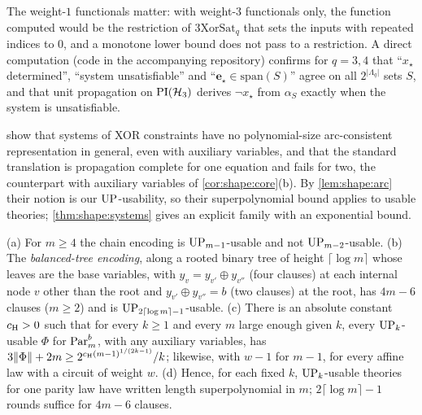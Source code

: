 The weight-$1$ functionals matter: with weight-$3$ functionals only, the function computed would be the restriction of $3\mathrm{XorSat}_q$ that sets the inputs with repeated indices to $0$, and a monotone lower bound does not pass to a restriction. A direct computation (code in the accompanying repository) confirms for $q=3,4$ that ``$x_\star$ determined'', ``system unsatisfiable'' and ``$\mathbf e_\star\in\mathrm{span}(S)$'' agree on all $2^{\lvert\Lambda_q\rvert}$ sets $S$, and that unit propagation on $\mathrm{PI}(\mathcal H_3)$ derives $\neg x_\star$ from $\alpha_S$ exactly when the system is unsatisfiable.

\begin{remark}\label{rem:shape:GK}
\citet{gwynne2014sat} show that systems of XOR constraints have no polynomial-size arc-consistent representation in general, even with auxiliary variables, and that the standard translation is propagation complete for one equation and fails for two, the counterpart with auxiliary variables of \cref{cor:shape:core}(b). By \cref{lem:shape:arc} their notion is our $\mathrm{UP}$-usability, so their superpolynomial bound applies to usable theories; \cref{thm:shape:systems} gives an explicit family with an exponential bound.
\end{remark}

\begin{proposition}\label{prop:shape:depth}
(a) For $m\ge4$ the chain encoding is $\mathrm{UP}_{m-1}$-usable and not $\mathrm{UP}_{m-2}$-usable.
(b) The \emph{balanced-tree encoding}, along a rooted binary tree of height $\lceil\log m\rceil$ whose leaves are the base variables, with $y_v=y_{v'}\oplus y_{v''}$ (four clauses) at each internal node $v$ other than the root and $y_{v'}\oplus y_{v''}=b$ (two clauses) at the root, has $4m-6$ clauses ($m\ge2$) and is $\mathrm{UP}_{2\lceil\log m\rceil-1}$-usable.
(c) There is an absolute constant $c_{\rm H}>0$ such that for every $k\ge1$ and every $m$ large enough given $k$, every $\mathrm{UP}_k$-usable $\Phi$ for $\mathrm{Par}^b_m$, with any auxiliary variables, has $3\lVert\Phi\rVert+2m\ge2^{c_{\rm H}(m-1)^{1/(2k-1)}}/k$; likewise, with $w-1$ for $m-1$, for every affine law with a circuit of weight $w$.
(d) Hence, for each fixed $k$, $\mathrm{UP}_k$-usable theories for one parity law have written length superpolynomial in $m$; $2\lceil\log m\rceil-1$ rounds suffice for $4m-6$ clauses.
\end{proposition}

